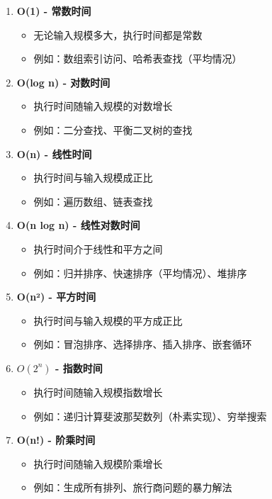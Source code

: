 \begin{enumerate}
  \item \textbf{O(1) - 常数时间}
    \begin{itemize}
      \item 无论输入规模多大，执行时间都是常数
      \item 例如：数组索引访问、哈希表查找（平均情况）
    \end{itemize}

  \item \textbf{O(log n) - 对数时间}
    \begin{itemize}
      \item 执行时间随输入规模的对数增长
      \item 例如：二分查找、平衡二叉树的查找
    \end{itemize}

  \item \textbf{O(n) - 线性时间}
    \begin{itemize}
      \item 执行时间与输入规模成正比
      \item 例如：遍历数组、链表查找
    \end{itemize}

  \item \textbf{O(n log n) - 线性对数时间}
    \begin{itemize}
      \item 执行时间介于线性和平方之间
      \item 例如：归并排序、快速排序（平均情况）、堆排序
    \end{itemize}

  \item \textbf{O(n²) - 平方时间}
    \begin{itemize}
      \item 执行时间与输入规模的平方成正比
      \item 例如：冒泡排序、选择排序、插入排序、嵌套循环
    \end{itemize}

  \item \textbf{$O(2^n)$ - 指数时间}
    \begin{itemize}
      \item 执行时间随输入规模指数增长
      \item 例如：递归计算斐波那契数列（朴素实现）、穷举搜索
    \end{itemize}

  \item \textbf{O(n!) - 阶乘时间}
    \begin{itemize}
      \item 执行时间随输入规模阶乘增长
      \item 例如：生成所有排列、旅行商问题的暴力解法
    \end{itemize}
\end{enumerate}

